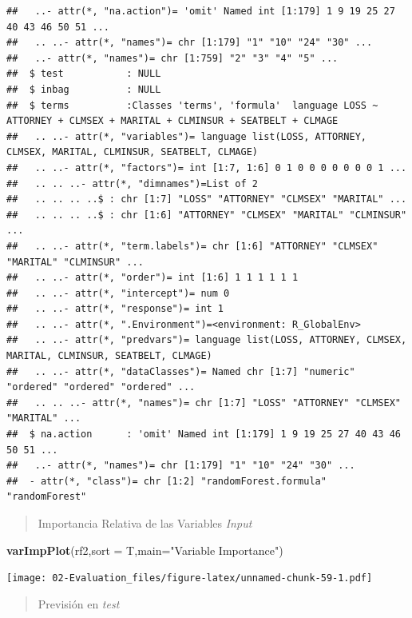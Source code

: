\documentclass[]{book}
\newenvironment{Shaded}{\begin{snugshade}}{\end{snugshade}}
\newcommand{\DataTypeTok}[1]{\textcolor[rgb]{0.13,0.29,0.53}{#1}}
\newcommand{\DecValTok}[1]{\textcolor[rgb]{0.00,0.00,0.81}{#1}}
\newcommand{\KeywordTok}[1]{\textcolor[rgb]{0.13,0.29,0.53}{\textbf{#1}}}
\newcommand{\NormalTok}[1]{#1}
\newcommand{\OperatorTok}[1]{\textcolor[rgb]{0.81,0.36,0.00}{\textbf{#1}}}
\newcommand{\StringTok}[1]{\textcolor[rgb]{0.31,0.60,0.02}{#1}}
\begin{document}
\begin{verbatim}
##   ..- attr(*, "na.action")= 'omit' Named int [1:179] 1 9 19 25 27 40 43 46 50 51 ...
##   .. ..- attr(*, "names")= chr [1:179] "1" "10" "24" "30" ...
##   ..- attr(*, "names")= chr [1:759] "2" "3" "4" "5" ...
##  $ test           : NULL
##  $ inbag          : NULL
##  $ terms          :Classes 'terms', 'formula'  language LOSS ~ ATTORNEY + CLMSEX + MARITAL + CLMINSUR + SEATBELT + CLMAGE
##   .. ..- attr(*, "variables")= language list(LOSS, ATTORNEY, CLMSEX, MARITAL, CLMINSUR, SEATBELT, CLMAGE)
##   .. ..- attr(*, "factors")= int [1:7, 1:6] 0 1 0 0 0 0 0 0 0 1 ...
##   .. .. ..- attr(*, "dimnames")=List of 2
##   .. .. .. ..$ : chr [1:7] "LOSS" "ATTORNEY" "CLMSEX" "MARITAL" ...
##   .. .. .. ..$ : chr [1:6] "ATTORNEY" "CLMSEX" "MARITAL" "CLMINSUR" ...
##   .. ..- attr(*, "term.labels")= chr [1:6] "ATTORNEY" "CLMSEX" "MARITAL" "CLMINSUR" ...
##   .. ..- attr(*, "order")= int [1:6] 1 1 1 1 1 1
##   .. ..- attr(*, "intercept")= num 0
##   .. ..- attr(*, "response")= int 1
##   .. ..- attr(*, ".Environment")=<environment: R_GlobalEnv> 
##   .. ..- attr(*, "predvars")= language list(LOSS, ATTORNEY, CLMSEX, MARITAL, CLMINSUR, SEATBELT, CLMAGE)
##   .. ..- attr(*, "dataClasses")= Named chr [1:7] "numeric" "ordered" "ordered" "ordered" ...
##   .. .. ..- attr(*, "names")= chr [1:7] "LOSS" "ATTORNEY" "CLMSEX" "MARITAL" ...
##  $ na.action      : 'omit' Named int [1:179] 1 9 19 25 27 40 43 46 50 51 ...
##   ..- attr(*, "names")= chr [1:179] "1" "10" "24" "30" ...
##  - attr(*, "class")= chr [1:2] "randomForest.formula" "randomForest"
\end{verbatim}

\begin{quote}
Importancia Relativa de las Variables \emph{Input}
\end{quote}

\begin{Shaded}
\begin{Highlighting}[]
\KeywordTok{varImpPlot}\NormalTok{(rf2,}\DataTypeTok{sort =}\NormalTok{ T,}\DataTypeTok{main=}\StringTok{"Variable Importance"}\NormalTok{)}
\end{Highlighting}
\end{Shaded}

\texttt{[image: 02-Evaluation\_files/figure-latex/unnamed-chunk-59-1.pdf]}

\begin{quote}
Previsión en \emph{test}
\end{quote}

\begin{Shaded}
\end{Shaded}
\end{document}
